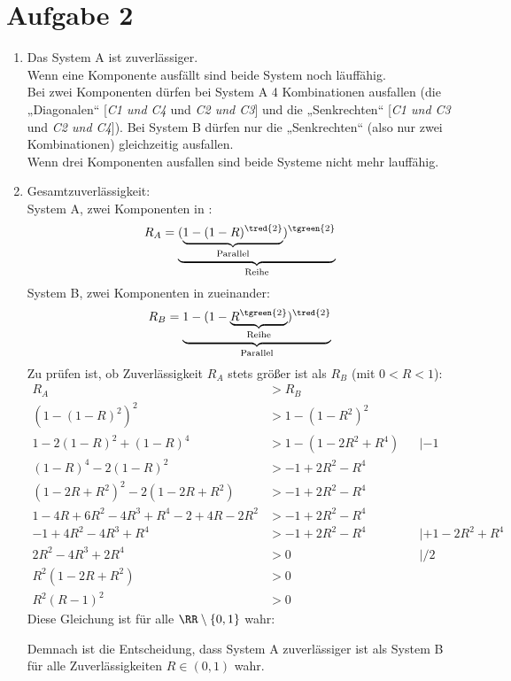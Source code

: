 \documentclass{scrartcl}
\begin{document}
\section{Aufgabe 2}
\begin{enumerate}[label=Q\arabic*:]
\item Das System A ist zuverlässiger. \\
Wenn eine Komponente ausfällt sind beide System noch läuffähig.\\
Bei zwei Komponenten dürfen bei System A 4 Kombinationen ausfallen (die „Diagonalen“ [\textit{C1 und C4} und \textit{C2 und C3}] und die „Senkrechten“ [\textit{C1 und C3} und \textit{C2 und C4}]). Bei System B dürfen nur die „Senkrechten“ (also nur zwei Kombinationen) gleichzeitig ausfallen.\\
Wenn drei Komponenten ausfallen sind beide Systeme nicht mehr lauffähig.
\item Gesamtzuverlässigkeit:\\
System A, zwei  Komponenten in :
$$R_A = \underbrace{(\underbrace{1-(1-R)^{\tred{2}}}_{\text{Parallel}})^{\tgreen{2}}}_{\text{Reihe}}$$
System B, zwei Komponenten in   zueinander:
$$R_B = \underbrace{1-(1-\underbrace{R^{\tgreen{2}}}_{\text{Reihe}})^{\tred{2}}}_{\text{Parallel}}$$
Zu prüfen ist, ob Zuverlässigkeit $R_A$ stets größer ist als $R_B$ (mit $0<R<1$):
\begin{align*}
R_A &> R_B\\
(1-(1-R)^2)^2 &> 1-(1-R^2)^2\\
1-2 (1-R)^2 +(1-R)^4 &> 1-(1-2 R^2 + R^4) &&| -1\\
(1-R)^4 - 2(1-R)^2 &> - 1+2R^2-R^4\\
(1-2R+R^2)^2 - 2(1-2R+R^2) &>- 1+2R^2-R^4\\
1-4R+6R^2-4R^3+R^4-2+4R-2R^2 &> - 1+2R^2-R^4\\
-1+4R^2-4R^3+R^4 &> - 1+2R^2-R^4 &&| + 1-2R^2+R^4\\
2R^2-4R^3+2R^4&>0 &&|/2\\
R^2(1-2R+R^2) &> 0\\
R^2(R-1)^2 &> 0
\end{align*}
Diese Gleichung ist für alle $\RR\setminus\{0,1\}$ wahr:
\begin{center}
\end{center}
Demnach ist die Entscheidung, dass System A zuverlässiger ist als System B für alle Zuverlässigkeiten $R\in (0,1)$ wahr.
\end{enumerate}
\end{document}
